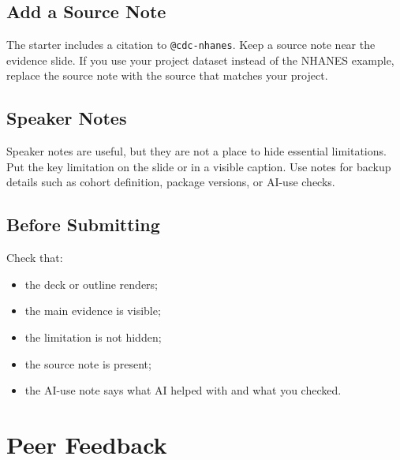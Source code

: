 \documentclass[
  letterpaper,
  DIV=11,
  numbers=noendperiod,
  oneside]{scrreprt}
\providecommand{\tightlist}{%
  \setlength{\itemsep}{0pt}\setlength{\parskip}{0pt}}
\begin{document}
\section*{Add a Source Note}\label{add-a-source-note}


The starter includes a citation to \texttt{@cdc-nhanes}. Keep a source
note near the evidence slide. If you use your project dataset instead of
the NHANES example, replace the source note with the source that matches
your project.

\section*{Speaker Notes}\label{speaker-notes}


Speaker notes are useful, but they are not a place to hide essential
limitations. Put the key limitation on the slide or in a visible
caption. Use notes for backup details such as cohort definition, package
versions, or AI-use checks.

\section*{Before Submitting}\label{before-submitting}


Check that:

\begin{itemize}
\tightlist
\item
  the deck or outline renders;
\item
  the main evidence is visible;
\item
  the limitation is not hidden;
\item
  the source note is present;
\item
  the AI-use note says what AI helped with and what you checked.
\end{itemize}

\chapter*{Peer Feedback}\label{peer-feedback}

\end{document}
